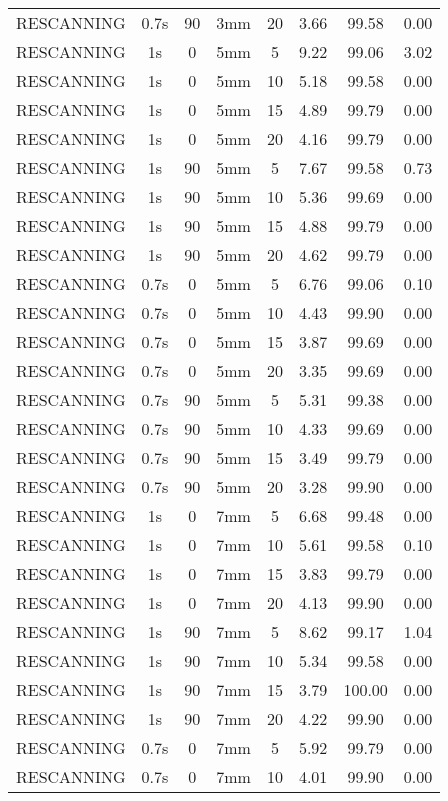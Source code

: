 \begin{table}[H]
\begin{tabular}{|c||c|c|c|c||c|c|c|}
RESCANNING & 0.7s & 90 & 3mm & 20 & 3.66 & 99.58 & 0.00 \\
RESCANNING & 1s & 0 & 5mm & 5 & 9.22 & 99.06 & 3.02 \\
RESCANNING & 1s & 0 & 5mm & 10 & 5.18 & 99.58 & 0.00 \\
RESCANNING & 1s & 0 & 5mm & 15 & 4.89 & 99.79 & 0.00 \\
RESCANNING & 1s & 0 & 5mm & 20 & 4.16 & 99.79 & 0.00 \\
RESCANNING & 1s & 90 & 5mm & 5 & 7.67 & 99.58 & 0.73 \\
RESCANNING & 1s & 90 & 5mm & 10 & 5.36 & 99.69 & 0.00 \\
RESCANNING & 1s & 90 & 5mm & 15 & 4.88 & 99.79 & 0.00 \\
RESCANNING & 1s & 90 & 5mm & 20 & 4.62 & 99.79 & 0.00 \\
RESCANNING & 0.7s & 0 & 5mm & 5 & 6.76 & 99.06 & 0.10 \\
RESCANNING & 0.7s & 0 & 5mm & 10 & 4.43 & 99.90 & 0.00 \\
RESCANNING & 0.7s & 0 & 5mm & 15 & 3.87 & 99.69 & 0.00 \\
RESCANNING & 0.7s & 0 & 5mm & 20 & 3.35 & 99.69 & 0.00 \\
RESCANNING & 0.7s & 90 & 5mm & 5 & 5.31 & 99.38 & 0.00 \\
RESCANNING & 0.7s & 90 & 5mm & 10 & 4.33 & 99.69 & 0.00 \\
RESCANNING & 0.7s & 90 & 5mm & 15 & 3.49 & 99.79 & 0.00 \\
RESCANNING & 0.7s & 90 & 5mm & 20 & 3.28 & 99.90 & 0.00 \\
RESCANNING & 1s & 0 & 7mm & 5 & 6.68 & 99.48 & 0.00 \\
RESCANNING & 1s & 0 & 7mm & 10 & 5.61 & 99.58 & 0.10 \\
RESCANNING & 1s & 0 & 7mm & 15 & 3.83 & 99.79 & 0.00 \\
RESCANNING & 1s & 0 & 7mm & 20 & 4.13 & 99.90 & 0.00 \\
RESCANNING & 1s & 90 & 7mm & 5 & 8.62 & 99.17 & 1.04 \\
RESCANNING & 1s & 90 & 7mm & 10 & 5.34 & 99.58 & 0.00 \\
RESCANNING & 1s & 90 & 7mm & 15 & 3.79 & 100.00 & 0.00 \\
RESCANNING & 1s & 90 & 7mm & 20 & 4.22 & 99.90 & 0.00 \\
RESCANNING & 0.7s & 0 & 7mm & 5 & 5.92 & 99.79 & 0.00 \\
RESCANNING & 0.7s & 0 & 7mm & 10 & 4.01 & 99.90 & 0.00 \\

\end{tabular}
\end{table}
